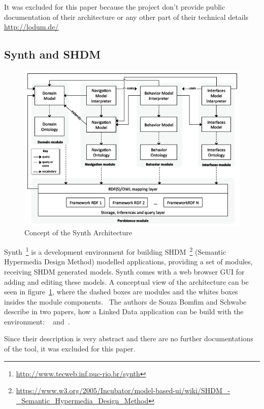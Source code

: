 It was excluded for this paper because the project don't provide public documentation of their architecture or any other part of their technical details
\url{http://lodum.de/}

\subsection{Synth and SHDM}

\begin{figure}[htbp]
	\centering
\includegraphics[width=\textwidth]{img/synth-concept.png}
	\caption{Concept of the Synth Architecture}
	\label{synth_concept}
\end{figure}

Synth~\footnote{\url{http://www.tecweb.inf.puc-rio.br/synth}} is a development environment for building SHDM~\footnote{\url{https://www.w3.org/2005/Incubator/model-based-ui/wiki/SHDM_-_Semantic_Hypermedia_Design_Method}} (Semantic Hypermedia Design Method) modelled applications, providing a set of modules, receiving SHDM generated models. Synth comes with a web browser GUI for adding and editing these models. A conceptual view of the architecture can be seen in figure~\ref{synth_concept}, where the dashed boxes are modules and the whites boxes insides the module components.~\cite{desynth} The authors de Souza Bomfim and Schwabe describe in two papers, how a Linked Data application can be build with the environment: ~\cite{desynth} and~\cite{de2011design}.

Since their description is very abstract and there are no further documentations of the tool, it was excluded for this paper. 